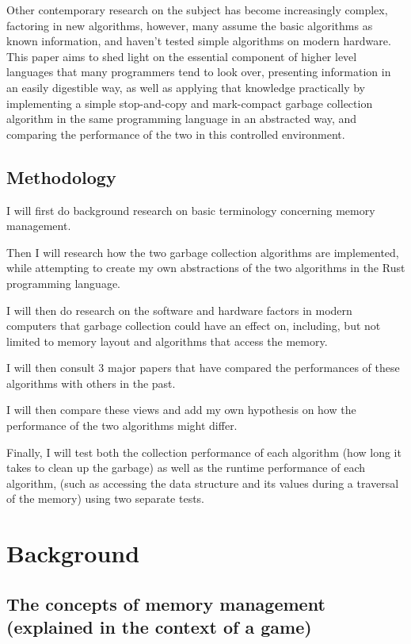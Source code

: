 \documentclass[index]{subfiles}
\begin{document}
Other contemporary research on the subject has become increasingly complex, factoring in new algorithms, however, many assume the basic algorithms as known information, and haven't tested simple algorithms on modern hardware. This paper aims to shed light on the essential component of higher level languages that many programmers tend to look over, presenting information in an easily digestible way, as well as applying that knowledge practically by implementing a simple stop-and-copy and mark-compact garbage collection algorithm in the same programming language in an abstracted way, and comparing the performance of the two in this controlled environment.

\subsection{Methodology}

I will first do background research on basic terminology concerning memory management.

Then I will research how the two garbage collection algorithms are implemented, while attempting to create my own abstractions of the two algorithms in the Rust programming language.

I will then do research on the software and hardware factors in modern computers that garbage collection could have an effect on, including, but not limited to memory layout and algorithms that access the memory.

I will then consult 3 major papers that have compared the performances of these algorithms with others in the past.

I will then compare these views and add my own hypothesis on how the performance of the two algorithms might differ.

Finally, I will test both the collection performance of each algorithm (how long it takes to clean up the garbage) as well as the runtime performance of each algorithm, (such as accessing the data structure and its values during a traversal of the memory) using two separate tests.

\section{Background}

\subsection{The concepts of memory management (explained in the context of a game)}
\end{document}
